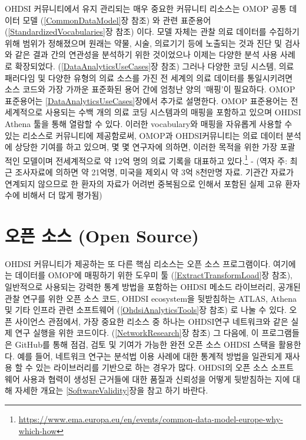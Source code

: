 \documentclass[11pt]{book}
\let\rmarkdownfootnote\footnote%
\def\footnote{\protect\rmarkdownfootnote}
\theoremstyle{definition}
\theoremstyle{definition}
\theoremstyle{definition}
\theoremstyle{remark}
\begin{document}
OHDSI 커뮤니티에서 유지 관리되는 매우 중요한 커뮤니티 리소스는 OMOP 공통
데이터 모델 (\ref{CommonDataModel}장 참조) 와 관련 표준용어
(\ref{StandardizedVocabularies}장 참조) 이다. 모델 자체는 관찰 의료
데이터를 수집하기 위해 범위가 정해졌으며 원래는 약물, 시술, 의료기기
등에 노출되는 것과 진단 및 검사와 같은 결과 간의 연관성을 분석하기 위한
것이었으나 이제는 다양한 분석 사용 사례로 확장되었다.
(\ref{DataAnalyticsUseCases}장 참조) 그러나 다양한 코딩 시스템, 의료
패러다임 및 다양한 유형의 의료 소스를 가진 전 세계의 의료 데이터를
통일시키려면 소스 코드와 가장 가까운 표준화된 용어 간에 엄청난 양의
'매핑'이 필요하다. OMOP 표준용어는 \ref{DataAnalyticsUseCases}장에서
추가로 설명한다. OMOP 표준용어는 전 세계적으로 사용되는 수백 개의 의료
코딩 시스템과의 매핑을 포함하고 있으며 OHDSI Athena 툴을 통해 열람할 수
있다. 이러한 vocabulary와 매핑을 자유롭게 사용할 수 있는 리소스로
커뮤니티에 제공함로써, OMOP과 OHDSI커뮤니티는 의료 데이터 분석에 상당한
기여를 하고 있으며, 몇 몇 연구자에 의하면, 이러한 목적을 위한 가장
포괄적인 모델이며 전세계적으로 약 12억 명의 의료 기록을 대표하고
있다.\footnote{\url{https://www.ema.europa.eu/en/events/common-data-model-europe-why-which-how}}
\citep{garza_2016} - (역자 주: 최근 조사자료에 의하면 약 21억명, 미국을
제외시 약 3억 8천만명 자료. 기관간 자료가 연계되지 않으므로 한 환자의
자료가 어려번 중복됨으로 인해서 포함된 실제 고유 환자 수에 비해서 더
많게 평가됨)

\section{오픈 소스 (Open Source)}\label{--open-source}


OHDSI 커뮤니티가 제공하는 또 다른 핵심 리소스는 오픈 소스 프로그램이다.
여기에는 데이터를 OMOP에 매핑하기 위한 도우미 툴
(\ref{ExtractTransformLoad}장 참조), 일반적으로 사용되는 강력한 통계
방법을 포함하는 OHDSI 메소드 라이브러리, 공개된 관찰 연구를 위한 오픈
소스 코드, OHDSI ecosystem을 뒷받침하는 ATLAS, Athena 및 기타 인프라
관련 소프트웨어 (\ref{OhdsiAnalyticsTools}장 참조) 로 나눌 수 있다. 오픈
사이언스 관점에서, 가장 중요한 리소스 중 하나는 OHDSI연구 네트워크와
같은 실제 연구 실행을 위한 코드이다. (\ref{NetworkResearch}장 참조) 그
다음에, 이 프로그램들은 GitHub를 통해 점검, 검토 및 기여가 가능한 완전
오픈 소스 OHDSI 스택을 활용한다. 예를 들어, 네트워크 연구는 분석법 이용
사례에 대한 통계적 방법을 일관되게 재사용 할 수 있는 라이브러리를
기반으로 하는 경우가 많다. OHDSI의 오픈 소스 소프트웨어 사용과 협력이
생성된 근거들에 대한 품질과 신뢰성을 어떻게 뒷받침하는 지에 대해 자세한
개요는 \ref{SoftwareValidity}장을 참고 하기 바란다.
\end{document}
